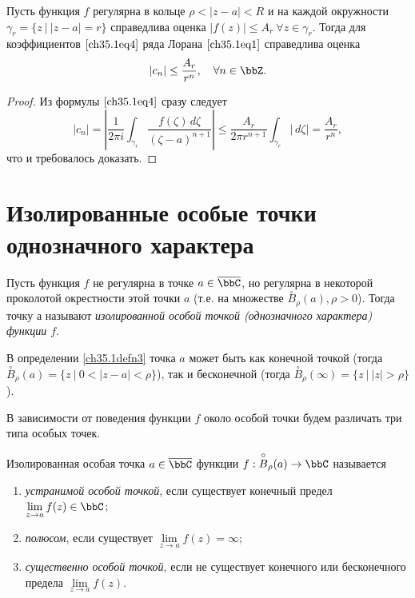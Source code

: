 \begin{cons}  \label{ch35.1cons3}
Пусть функция $f$ регулярна в кольце $\rho < |z - a| < R$ и на каждой окружности $\gamma_r = \{ z \: \big| \: |z - a| = r\}$ справедлива оценка $|f(z)| \le A_r \: \forall z \in \gamma_r$. Тогда для коэффициентов $\eqref{ch35.1eq4}$ ряда Лорана $\eqref{ch35.1eq1}$ справедлива оценка
\begin{equation} \label{ch35.1eq20}
|c_n| \le \frac{A_r}{r^n}, \quad \forall n \in \bbZ.
\end{equation}

\begin{proof}
Из формулы $\eqref{ch35.1eq4}$ сразу следует
$$
|c_n| = \left| \frac{1}{2\pi i} \int_{\gamma_r} \frac{f(\zeta)\,d\zeta}{(\zeta - a)^{n + 1}} \right| \le \frac{A_r}{2\pi r^{n + 1}} \int_{\gamma_r} |\,d\zeta| = \frac{A_r}{r^n},
$$
что и требовалось доказать.
\end{proof}
\end{cons}

\section{Изолированные особые точки однозначного характера}

\begin{defn}\label{ch35.1defn3}
Пусть функция $f$ не регулярна в точке $a \in \overline{\bbC}$, но регулярна в некоторой проколотой окрестности этой точки $a$ (т.е. на множестве $\overset{\circ}{B}_\rho(a), \rho > 0$). Тогда точку $а$ называют \textit{изолированной особой точкой (однозначного характера) функции $f$}.
\end{defn}

В определении \ref{ch35.1defn3} точка $a$ может быть как конечной точкой (тогда $\overset{\circ}{B}_\rho(a) = \{ z \: \big| \: 0 < |z - a| < \rho\}$), так и бесконечной (тогда $\overset{\circ}{B}_\rho(\infty) = \{ z \: \big| \: |z| > \rho\}$).

В зависимости от поведения функции $f$ около особой точки будем различать три типа особых точек.

\begin{defn}
Изолированная особая точка $a \in \overline{\bbC}$ функции $f : \overset{\circ}{B}_\rho(a) \to \bbC$ называется
\begin{enumerate}
\item \textit{устранимой особой точкой}, если существует конечный предел $\lim\limits_{z \to a} f(z) \in \bbC$;
\item	\textit{полюсом}, если существует $\lim\limits_{z \to a} f(z) = \infty$;
\item \textit{существенно особой точкой}, если не существует конечного или бесконечного предела $\lim\limits_{z \to a} f(z)$.
\end{enumerate}
\end{defn}

